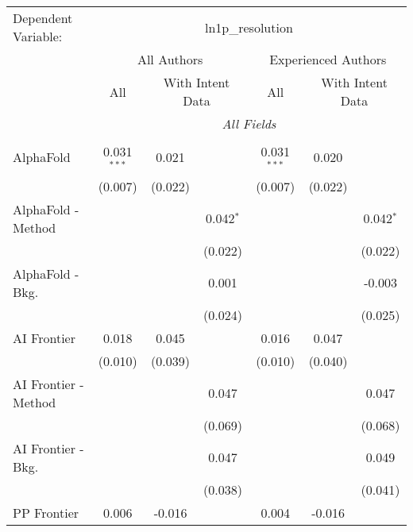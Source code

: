 \begingroup
\centering
\begin{tabular}{lcccccc}
   \tabularnewline \midrule \midrule
   Dependent Variable: & \multicolumn{6}{c}{ln1p\_resolution}\\
 & \multicolumn{3}{c}{All Authors} & \multicolumn{3}{c}{Experienced Authors} \\
\cmidrule(lr){2-4} \cmidrule(lr){5-7}
 & \multicolumn{1}{c}{All} & \multicolumn{2}{c}{With Intent Data} & \multicolumn{1}{c}{All} & \multicolumn{2}{c}{With Intent Data} \\
\cmidrule(lr){2-2} \cmidrule(lr){3-4} \cmidrule(lr){5-5} \cmidrule(lr){6-7}
 & \multicolumn{6}{c}{\textit{All Fields}} \\ \\
   AlphaFold            & 0.031$^{***}$ & 0.021   &             & 0.031$^{***}$ & 0.020   &   \\   
                        & (0.007)       & (0.022) &             & (0.007)       & (0.022) &   \\   
   AlphaFold - Method   &               &         & 0.042$^{*}$ &               &         & 0.042$^{*}$\\   
                        &               &         & (0.022)     &               &         & (0.022)\\   
   AlphaFold - Bkg.     &               &         & 0.001       &               &         & -0.003\\   
                        &               &         & (0.024)     &               &         & (0.025)\\   
   AI Frontier          & 0.018         & 0.045   &             & 0.016         & 0.047   &   \\   
                        & (0.010)       & (0.039) &             & (0.010)       & (0.040) &   \\   
   AI Frontier - Method &               &         & 0.047       &               &         & 0.047\\   
                        &               &         & (0.069)     &               &         & (0.068)\\   
   AI Frontier - Bkg.   &               &         & 0.047       &               &         & 0.049\\   
                        &               &         & (0.038)     &               &         & (0.041)\\   
   PP Frontier          & 0.006         & -0.016  &             & 0.004         & -0.016  &   \\   

\end{tabular}
